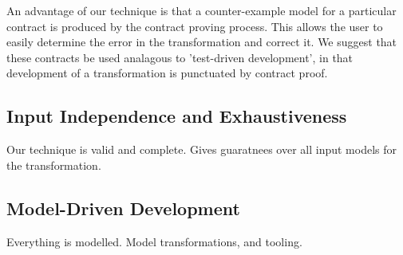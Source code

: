 An advantage of our technique is that a counter-example model for a particular contract is produced by the contract proving process. This allows the user to easily determine the error in the transformation and correct it. We suggest that these contracts be used analagous to 'test-driven development', in that development of a transformation is punctuated by contract proof.

\subsection{Input Independence and Exhaustiveness}

Our technique is valid and complete. Gives guaratnees over all input models for the transformation.

\subsection{Model-Driven Development}

Everything is modelled. Model transformations, and tooling.
 